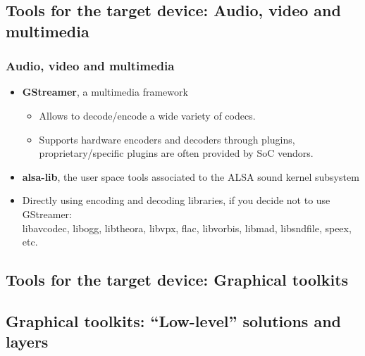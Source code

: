 \subsection[Multimedia tools]{Tools for the target device: Audio,
  video and multimedia}

\begin{frame}
  \frametitle{Audio, video and multimedia}
  \begin{itemize}
  \item {\bf GStreamer}, a multimedia framework
    \begin{itemize}
    \item Allows to decode/encode a wide variety of codecs.
    \item Supports hardware encoders and decoders through plugins,
      proprietary/specific plugins are often provided by SoC vendors.
    \end{itemize}
  \item {\bf alsa-lib}, the user space tools associated to the ALSA sound
    kernel subsystem
  \item Directly using encoding and decoding libraries, if you decide
    not to use GStreamer:\\
    libavcodec, libogg, libtheora, libvpx, flac, libvorbis, libmad,
    libsndfile, speex, etc.
  \end{itemize}
\end{frame}

\subsection[Graphical toolkits]{Tools for the target device: Graphical
  toolkits}

\subsection[Low-level toolkits]{Graphical toolkits:
``Low-level'' solutions and layers}

